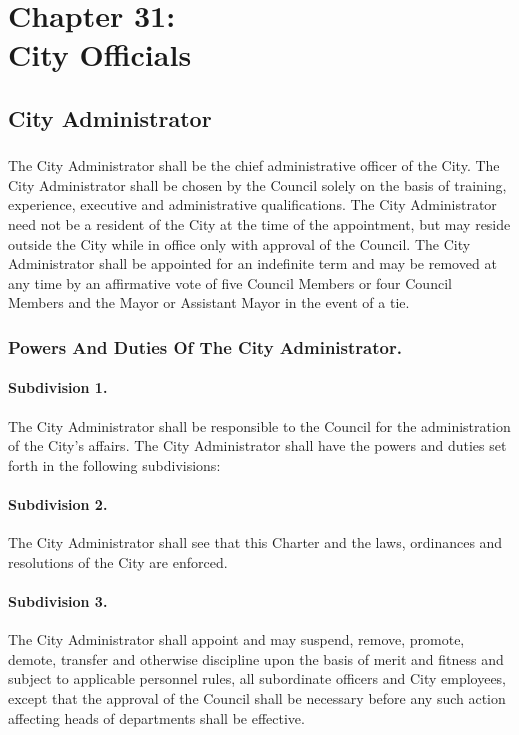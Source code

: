\chapter*{Chapter 31: \\
	City Officials}
    \vfill
    \minitoc
    \pagebreak

\section{City Administrator}
\subsection{}
The City Administrator shall be the chief administrative officer of the City. The City Administrator shall be chosen by the Council solely on the basis of training, experience, executive and administrative qualifications. The City Administrator need not be a resident of the City at the time of the appointment, but may reside outside the City while in office only with approval of the Council. The City Administrator shall be appointed for an indefinite term and may be removed at any time by an affirmative vote of five Council Members or four Council Members and the Mayor or Assistant Mayor in the event of a tie.
\subsection{Powers And Duties Of The City Administrator.}
\subsubsection*{Subdivision 1.}
The City Administrator shall be responsible to the Council for the administration of the City’s affairs. The City Administrator shall have the powers and duties set forth in the following subdivisions:
\subsubsection*{Subdivision 2.}
The City Administrator shall see that this Charter and the laws, ordinances and resolutions of the City are enforced.
\subsubsection*{Subdivision 3.}
The City Administrator shall appoint and may suspend, remove, promote, demote, transfer and otherwise discipline upon the basis of merit and fitness and subject to applicable personnel rules, all subordinate officers and City employees, except that the approval of the Council shall be necessary before any such action affecting heads of departments shall be effective.
